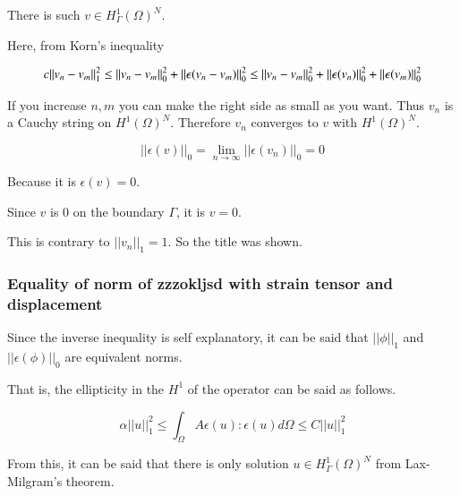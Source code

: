 There is such $v\in H^1_\Gamma(\Omega)^N$.

Here, from Korn's inequality

\begin{equation}
c||v_n-v_m||^2_1\le ||v_n-v_m||^2_0+||\epsilon(v_n-v_m)||^2_0\\\le ||v_n-v_m||^2_0+||\epsilon(v_n)||^2_0+||\epsilon(v_m)||^2_0
\end{equation}


If you increase $n,m$ you can make the right side as small as you want. Thus $v_n$ is a Cauchy string on $H^1(\Omega)^N$. Therefore $v_n$ converges to $v$ with $H^1(\Omega)^N$.

\begin{equation}
||\epsilon(v)||_0=\lim_{n\rightarrow \infty}||\epsilon(v_n)||_0=0
\end{equation}

Because it is $\epsilon(v)=0$.

Since $v$ is 0 on the boundary $\Gamma$, it is $v=0$.

This is contrary to $||v_n||_1 = 1$. So the title was shown.


\subsubsection{Equality of norm of zzzokljsd with strain tensor and displacement}



Since the inverse inequality is self explanatory, it can be said that $||\phi||_1$ and $||\epsilon(\phi)||_0$ are equivalent norms.

That is, the ellipticity in the $H^1$ of the operator can be said as follows.

\begin{equation}
\alpha ||u||^2_1 \le \int_{\Omega} A \epsilon(u):\epsilon(u)d\Omega\le C ||u||^2_1
\end{equation}


From this, it can be said that there is only solution $u\in H^1_\Gamma(\Omega)^N$ from Lax-Milgram's theorem.








